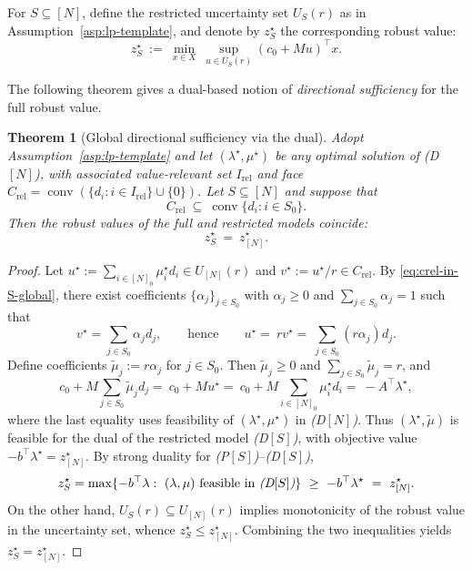 \documentclass[accepted]{uai2026}
\theoremstyle{plain}
\newtheorem{theorem}{Theorem}[section]
\theoremstyle{definition}
\theoremstyle{remark}
\DeclareMathOperator{\conv}{conv}
\begin{document}
For $S\subseteq[N]$, define the restricted uncertainty set $U_S(r)$ as in
Assumption~\ref{asp:lp-template}, and denote by $z_S^\star$ the corresponding
robust value:
\[
z_S^\star\ :=\ \min_{x\in X}\ \sup_{u\in U_S(r)} (c_0+Mu)^\top x.
\]

The following theorem gives a dual-based notion of \emph{directional sufficiency}
for the full robust value.

\begin{theorem}[Global directional sufficiency via the dual]
\label{thm:dir-suff-global}
Adopt Assumption~\ref{asp:lp-template} and let
$(\lambda^\star,\mu^\star)$ be any optimal solution of \emph{(D$[N]$)},
with associated value-relevant set $I_{\mathrm{rel}}$ and face
$C_{\mathrm{rel}}=\conv(\{d_i : i\in I_{\mathrm{rel}}\}\cup\{0\})$.
Let $S\subseteq[N]$ and suppose that
\begin{equation}
\label{eq:crel-in-S-global}
C_{\mathrm{rel}}\ \subseteq\ \conv\{d_i : i\in S_0\}.
\end{equation}
Then the robust values of the full and restricted models coincide:
\[
z_S^\star\ =\ z_{[N]}^\star.
\]
\end{theorem}

\begin{proof}
Let $u^\star:=\sum_{i\in[N]_0}\mu_i^\star d_i\in U_{[N]}(r)$ and
$v^\star:=u^\star/r\in C_{\mathrm{rel}}$.
By \eqref{eq:crel-in-S-global}, there exist coefficients
$\{\alpha_j\}_{j\in S_0}$ with $\alpha_j\ge 0$ and
$\sum_{j\in S_0}\alpha_j=1$ such that
\[
v^\star=\sum_{j\in S_0}\alpha_j d_j,
\qquad\text{hence}\qquad
u^\star
=\ r v^\star
=\ \sum_{j\in S_0}(r\alpha_j)d_j.
\]
Define coefficients $\widetilde\mu_j:=r\alpha_j$ for $j\in S_0$. Then
$\widetilde\mu_j\ge 0$ and $\sum_{j\in S_0}\widetilde\mu_j=r$, and
\[
c_0 + M\sum_{j\in S_0}\widetilde\mu_j d_j
=\ c_0 + Mu^\star
=\ c_0 + M\sum_{i\in[N]_0}\mu_i^\star d_i
=\ -A^\top\lambda^\star,
\]
where the last equality uses feasibility of $(\lambda^\star,\mu^\star)$ in
\emph{(D$[N]$)}.
Thus $(\lambda^\star,\widetilde\mu)$ is feasible for the dual of the
restricted model \emph{(D$[S]$)}, with objective value
$-b^\top\lambda^\star=z_{[N]}^\star$.
By strong duality for \emph{(P$[S]$)}--\emph{(D$[S]$)},
\[
z_S^\star
=\max\{-b^\top\lambda:\ (\lambda,\mu)\ \text{feasible in \emph{(D$[S]$)}}\}
\ \ge\ -b^\top\lambda^\star
\ =\ z_{[N]}^\star.
\]
On the other hand, $U_S(r)\subseteq U_{[N]}(r)$ implies monotonicity of the
robust value in the uncertainty set, whence $z_S^\star\le z_{[N]}^\star$.
Combining the two inequalities yields $z_S^\star=z_{[N]}^\star$.
\end{proof}
\end{document}
